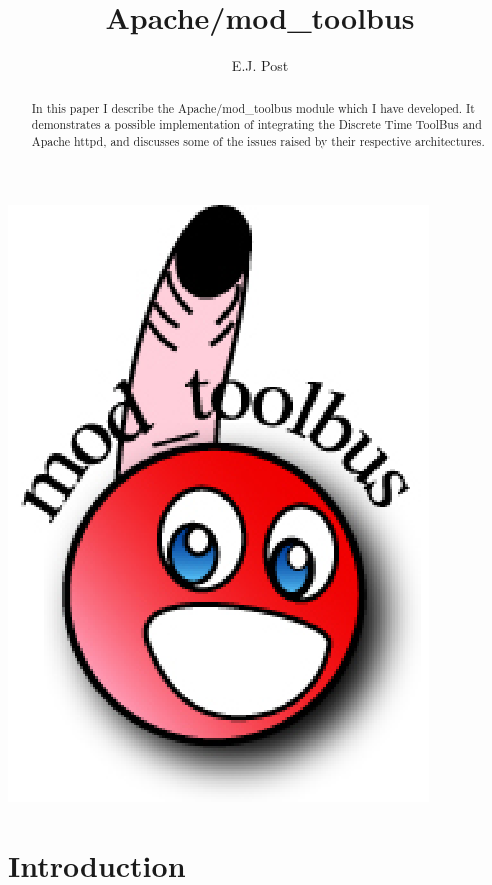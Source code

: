 \documentclass[a4paper,10pt]{article}
\title{}
\author{}
\begin{document}
\title{Apache/mod\_toolbus}
\author{E.J. Post}
\maketitle

\vspace{2cm}
\begin{centering}
\hspace{3cm}
\includegraphics{figures/logo-mod_toolbus-small.eps}
\end{centering}
\vspace{2cm}

\begin{abstract}
In this paper I describe the Apache/mod\_toolbus module which I have developed. It demonstrates a possible implementation of integrating the Discrete Time ToolBus and Apache httpd, and discusses some of the issues raised by their respective architectures.
\end{abstract}


\newpage
\tableofcontents
\newpage 

\section{Introduction}
\end{document}
